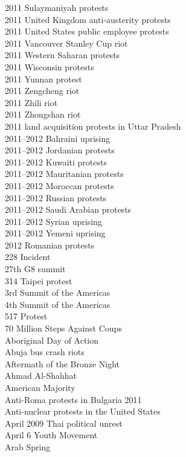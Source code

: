 2011 Sulaymaniyah protests\\
2011 United Kingdom anti-austerity protests\\
2011 United States public employee protests\\
2011 Vancouver Stanley Cup riot\\
2011 Western Saharan protests\\
2011 Wisconsin protests\\
2011 Yunnan protest\\
2011 Zengcheng riot\\
2011 Zhili riot\\
2011 Zhongshan riot\\
2011 land acquisition protests in Uttar Pradesh\\
2011–2012 Bahraini uprising\\
2011–2012 Jordanian protests\\
2011–2012 Kuwaiti protests\\
2011–2012 Mauritanian protests\\
2011–2012 Moroccan protests\\
2011–2012 Russian protests\\
2011–2012 Saudi Arabian protests\\
2011–2012 Syrian uprising\\
2011–2012 Yemeni uprising\\
2012 Romanian protests\\
228 Incident\\
27th G8 summit\\
314 Taipei protest\\
3rd Summit of the Americas\\
4th Summit of the Americas\\
517 Protest\\
70 Million Steps Against Coups\\
Aboriginal Day of Action\\
Abuja bus crash riots\\
Aftermath of the Bronze Night\\
Ahmad Al-Shahhat\\
American Majority\\
Anti-Roma protests in Bulgaria 2011\\
Anti-nuclear protests in the United States\\
April 2009 Thai political unrest\\
April 6 Youth Movement\\
Arab Spring\\
